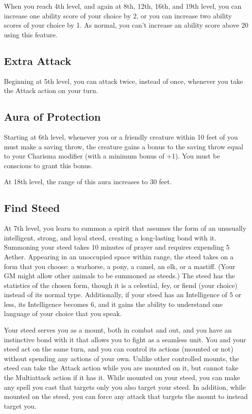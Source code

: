 When you reach 4th level, and again at 8th, 12th, 16th, and 19th level, you can increase one ability score of your choice by 2, or you can increase two ability scores of your choice by 1. As normal, you can't increase an ability score above 20 using this feature.

\subsection{Extra Attack}

Beginning at 5th level, you can attack twice, instead of once, whenever you take the Attack action on your turn.

\subsection{Aura of Protection}

Starting at 6th level, whenever you or a friendly creature within 10 feet of you must make a saving throw, the creature gains a bonus to the saving throw equal to your Charisma modifier (with a minimum bonus of +1). You must be conscious to grant this bonus.

At 18th level, the range of this aura increases to 30 feet.

\subsection{Find Steed}

At 7th level, you learn to summon a spirit that assumes the form of an unusually intelligent, strong, and loyal steed, creating a long-lasting bond with it. Summoning your steed takes 10 minutes of prayer and requires expending 5 Aether. Appearing in an unoccupied space within range, the steed takes on a form that you choose: a warhorse, a pony, a camel, an elk, or a mastiff. (Your GM might allow other animals to be summoned as steeds.) The steed has the statistics of the chosen form, though it is a celestial, fey, or fiend (your choice) instead of its normal type. Additionally, if your steed has an Intelligence of 5 or less, its Intelligence becomes 6, and it gains the ability to understand one language of your choice that you speak.

Your steed serves you as a mount, both in combat and out, and you have an instinctive bond with it that allows you to fight as a seamless unit. You and your steed act on the same turn, and you can control its actions (mounted or not) without spending any actions of your own. Unlike other controlled mounts, the steed can take the Attack action while you are mounted on it, but cannot take the Multiattack action if it has it. While mounted on your steed, you can make any spell you cast that targets only you also target your steed. In addition, while mounted on the steed, you can force any attack that targets the mount to instead target you.

